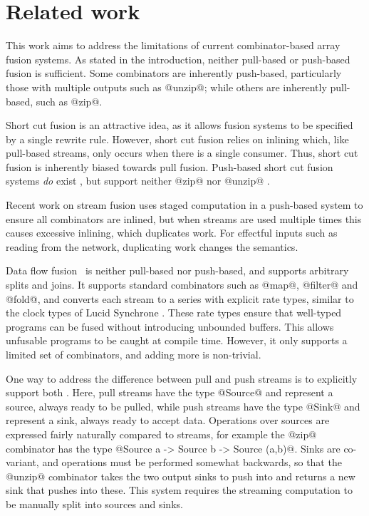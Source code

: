 \section{Related work}


This work aims to address the limitations of current combinator-based array fusion systems.
As stated in the introduction, neither pull-based or push-based fusion is sufficient.
Some combinators are inherently push-based, particularly those with multiple outputs such as @unzip@; while others are inherently pull-based, such as @zip@.

Short cut fusion is an attractive idea, as it allows fusion systems to be specified by a single rewrite rule.
However, short cut fusion relies on inlining which, like pull-based streams, only occurs when there is a single consumer.
Thus, short cut fusion is inherently biased towards pull fusion.
Push-based short cut fusion systems \emph{do} exist \cite{gill1993short}, but support neither @zip@ nor @unzip@ \cite{svenningsson2002shortcut,lippmeier2013data}.

Recent work on stream fusion \cite{kiselyov2016stream} uses staged computation in a push-based system to ensure all combinators are inlined, but when streams are used multiple times this causes excessive inlining, which duplicates work.
For effectful inputs such as reading from the network, duplicating work changes the semantics.

Data flow fusion~\cite{lippmeier2013data} is neither pull-based nor push-based, and supports arbitrary splits and joins.
It supports standard combinators such as @map@, @filter@ and @fold@, and converts each stream to a series with explicit rate types, similar to the clock types of Lucid Synchrone \cite{benveniste2003synchronous}.
These rate types ensure that well-typed programs can be fused without introducing unbounded buffers.
This allows unfusable programs to be caught at compile time.
However, it only supports a limited set of combinators, and adding more is non-trivial.

One way to address the difference between pull and push streams is to explicitly support both \cite{bernardy2015duality, lippmeier2016polarized}.
Here, pull streams have the type @Source@ and represent a source, always ready to be pulled, while push streams have the type @Sink@ and represent a sink, always ready to accept data.
Operations over sources are expressed fairly naturally compared to streams, for example the @zip@ combinator has the type @Source a -> Source b -> Source (a,b)@.
Sinks are co-variant, and operations must be performed somewhat backwards, so that the @unzip@ combinator takes the two output sinks to push into and returns a new sink that pushes into these.
This system requires the streaming computation to be manually split into sources and sinks.


